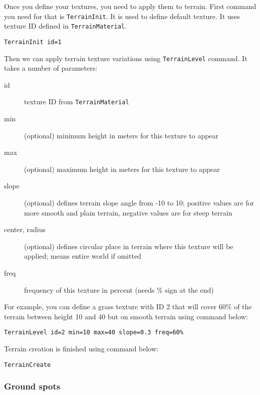 Once you define your textures, you need to apply them to terrain. First command you need for that is \texttt{TerrainInit}. It is used to define default texture. It uses texture ID defined in \texttt{TerrainMaterial}.

\begin{lstlisting}[style=scene]
TerrainInit id=1
\end{lstlisting}

Then we can apply terrain texture variations using \texttt{TerrainLevel} command. It takes a number of parameters:

\begin{description}
    \item[id] texture ID from \texttt{TerrainMaterial}
    \item[min] (optional) minimum height in meters for this texture to appear
    \item[max] (optional) maximum height in meters for this texture to appear
    \item[slope] (optional) defines terrain slope angle from -10 to 10; positive values are for more smooth and plain terrain, negative values are for steep terrain
    \item[center, radius] (optional) defines circular place in terrain where this texture will be applied; means entire world if omitted
    \item[freq] frequency of this texture in percent (needs \% sign at the end)
\end{description}

For example, you can define a grass texture with ID 2 that will cover 60\% of the terrain between height 10 and 40 but on smooth terrain using command below:

\begin{lstlisting}[style=scene]
TerrainLevel id=2 min=10 max=40 slope=0.3 freq=60%
\end{lstlisting}

Terrain creation is finished using command below:

\begin{lstlisting}[style=scene]
TerrainCreate
\end{lstlisting}


\subsubsection{Ground spots}

